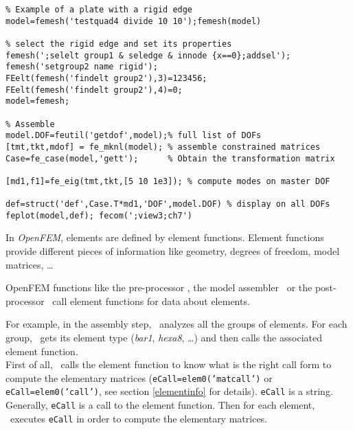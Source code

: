\begin{verbatim}
% Example of a plate with a rigid edge
model=femesh('testquad4 divide 10 10');femesh(model)

% select the rigid edge and set its properties
femesh(';selelt group1 & seledge & innode {x==0};addsel');
femesh('setgroup2 name rigid');
FEelt(femesh('findelt group2'),3)=123456;
FEelt(femesh('findelt group2'),4)=0;
model=femesh;

% Assemble
model.DOF=feutil('getdof',model);% full list of DOFs
[tmt,tkt,mdof] = fe_mknl(model); % assemble constrained matrices
Case=fe_case(model,'gett');      % Obtain the transformation matrix

[md1,f1]=fe_eig(tmt,tkt,[5 10 1e3]); % compute modes on master DOF

def=struct('def',Case.T*md1,'DOF',model.DOF) % display on all DOFs
feplot(model,def); fecom(';view3;ch7')
\end{verbatim}






\begin{center}
\end{center}

In {\sl OpenFEM}, elements are defined by element functions. Element functions provide different pieces of information like geometry, degrees of freedom, model matrices, \ldots

OpenFEM functions like the pre-processor \femesh, the model assembler \femk\ or the post-processor \feplot\ call element functions for data about elements.

For example, in the assembly step, \femk\ analyzes all the groups of elements. For each group, \femk\ gets its element type ({\sl bar1}, {\sl hexa8}, \ldots) and then calls the associated element function.\\
First of all, \femk\ calls the element function to know what is the right call form to compute the elementary matrices ({\tt eCall=elem0('matcall')} or {\tt eCall=elem0('call')}, see section \ref{elementinfo} for details). {\tt eCall} is a string. Generally, {\tt eCall} is a call to the element function. Then for each element, \femk\ executes {\tt eCall} in order to compute the elementary matrices. 

